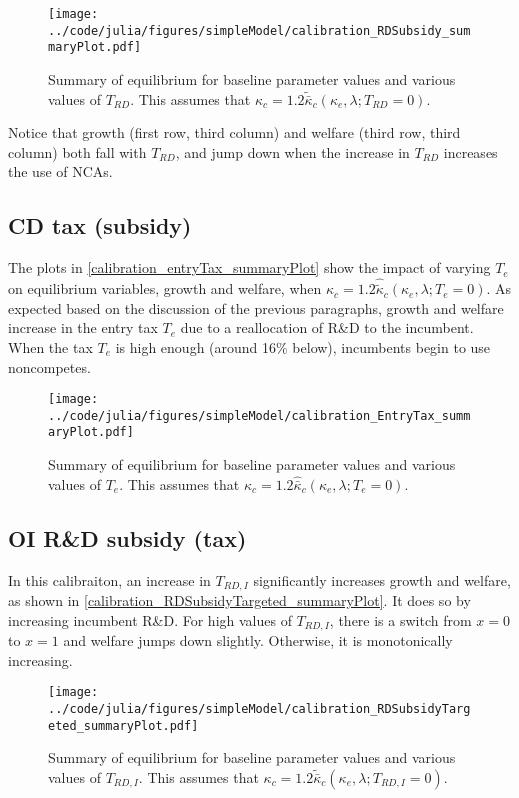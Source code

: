 \documentclass[11pt,english]{article}
\begin{document}
\begin{figure}[]
	\texttt{[image: ../code/julia/figures/simpleModel/calibration\_RDSubsidy\_summaryPlot.pdf]}
	\caption{Summary of equilibrium for baseline parameter values and various values of $T_{RD}$. This assumes that $\kappa_c = 1.2 \tilde{\bar{\kappa}}_c(\kappa_e,\lambda;T_{RD} = 0)$.}
	\label{calibration_RDSubsidy_summaryPlot}
\end{figure}

Notice that growth (first row, third column) and welfare (third row, third column) both fall with $T_{RD}$, and jump down when the increase in $T_{RD}$ increases the use of NCAs.


\subsection{CD tax (subsidy)}\label{subsec:cd_tax}


The plots in \autoref{calibration_entryTax_summaryPlot} show the impact of varying $T_e$ on equilibrium variables, growth and welfare, when $\kappa_c = 1.2 \hat{\tilde{\kappa}}_c(\kappa_e,\lambda;T_e = 0)$. As expected based on the discussion of the previous paragraphs, growth and welfare increase in the entry tax $T_e$ due to a reallocation of R\&D to the incumbent. When the tax $T_e$ is high enough (around 16\% below), incumbents begin to use noncompetes.  

\begin{figure}[]
	\texttt{[image: ../code/julia/figures/simpleModel/calibration\_EntryTax\_summaryPlot.pdf]}
	\caption{Summary of equilibrium for baseline parameter values and various values of $T_e$. This assumes that $\kappa_c = 1.2 \hat{\bar{\kappa}}_c(\kappa_e,\lambda;T_e = 0)$.}
	\label{calibration_entryTax_summaryPlot}
\end{figure}

\subsection{OI R\&D subsidy (tax)}\label{cs:oi_rd_subsidy}

In this calibraiton, an increase in $T_{RD,I}$ significantly increases growth and welfare, as shown in \autoref{calibration_RDSubsidyTargeted_summaryPlot}. It does so by increasing incumbent R\&D. For high values of $T_{RD,I}$, there is a switch from $x = 0$ to $x = 1$ and welfare jumps down slightly. Otherwise, it is monotonically increasing. 

\begin{figure}[]
	\texttt{[image: ../code/julia/figures/simpleModel/calibration\_RDSubsidyTargeted\_summaryPlot.pdf]}
	\caption{Summary of equilibrium for baseline parameter values and various values of $T_{RD,I}$. This assumes that $\kappa_c = 1.2 \tilde{\bar{\kappa}}_c(\kappa_e,\lambda;T_{RD,I} = 0)$.}
	\label{calibration_RDSubsidyTargeted_summaryPlot}
\end{figure}
\end{document}
